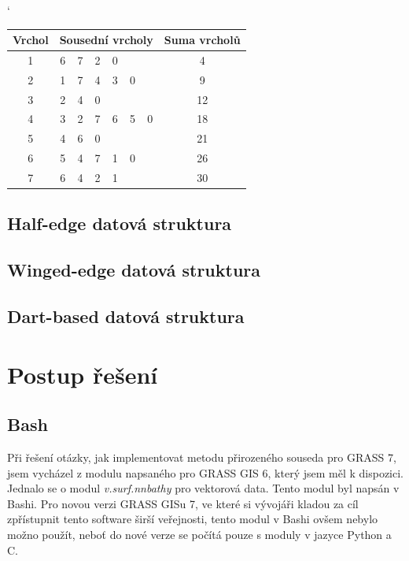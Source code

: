 \documentclass[12pt,a4paper]{article}
\begin{document}
\begin{table}[h]
\catcode`
\begin{tabular}{|c||c|c|c|c|c|c||c|}
\hline
Vrchol & \multicolumn{6}{|c|}{Sousední vrcholy} & Suma vrcholů \\ \hline \hline
1      & 6    & 7    & 2    & 0    &     &     & 4            \\ \hline
2      & 1    & 7    & 4    & 3    & 0   &     & 9            \\ \hline
3      & 2    & 4    & 0    &      &     &     & 12           \\ \hline
4      & 3    & 2    & 7    & 6    & 5   & 0   & 18           \\ \hline
5      & 4    & 6    & 0    &      &     &     & 21           \\ \hline
6      & 5    & 4    & 7    & 1    & 0   &     & 26           \\ \hline
7      & 6    & 4    & 2    & 1    &     &     & 30           \\ \hline
\end{tabular}
\end{table}

\subsection{Half-edge datová struktura}
\subsection{Winged-edge datová struktura}
\subsection{Dart-based datová struktura}


\newpage
\section{Postup řešení}
\subsection{Bash}
Při řešení otázky, jak implementovat metodu přirozeného souseda pro GRASS 7, jsem vycházel z modulu napsaného pro GRASS GIS 6, který jsem měl k dispozici. Jednalo se o modul \textit{v.surf.nnbathy} pro vektorová data. Tento modul byl napsán v Bashi. Pro novou verzi GRASS GISu 7, ve které si vývojáři kladou za cíl zpřístupnit tento software širší veřejnosti, tento modul v Bashi ovšem nebylo možno použít, neboť do nové verze se počítá pouze s moduly v jazyce Python a C.
\end{document}
